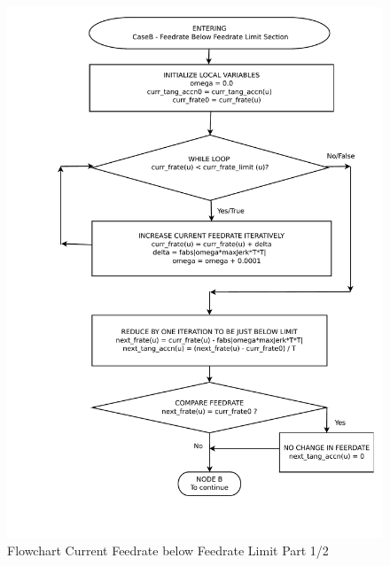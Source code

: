 \begin{figure}
	\caption{Flowchart Current Feedrate below Feedrate Limit Part 1/2}
	\label{02-CaseB1-Feedrate-Below-Limit-Main-Region-flowchart.pdf}
	\includegraphics[width=1.10\textwidth,]{Images/Chap3/02-CaseB1-Feedrate-Below-Limit-Main-Region-flowchart.pdf} 
\end{figure}

\clearpage
\pagebreak

